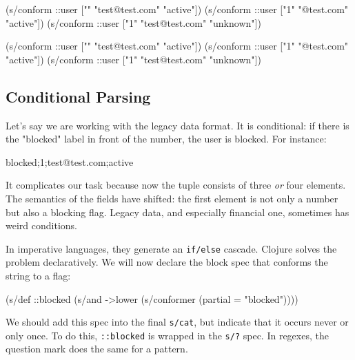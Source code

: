 \begin{english}
  \begin{clojure}
(s/conform ::user
  ["" "test@test.com" "active"])
(s/conform ::user
  ["1" "@test.com" "active"])
(s/conform ::user
  ["1" "test@test.com" "unknown"])
  \end{clojure}
\end{english}

\else

\begin{english}
 \begin{clojure}
(s/conform ::user ["" "test@test.com" "active"])
(s/conform ::user ["1" "@test.com" "active"])
(s/conform ::user ["1" "test@test.com" "unknown"])
  \end{clojure}
\end{english}

\fi

\subsection{Conditional Parsing}

Let's say we are working with the legacy data format. It is conditional: if there is the "blocked" label in front of the number, the user is blocked. For instance:

\begin{english}
  \begin{text}
blocked;1;test@test.com;active
  \end{text}
\end{english}

It complicates our task because now the tuple consists of three 
\emph{or} four elements. The semantics of the fields have shifted: the first element is not only a number but also a blocking flag. Legacy data, and especially financial one, sometimes has weird conditions.

In imperative languages, they generate an \verb|if/else| cascade. Clojure solves the problem declaratively. We will now declare the block spec that conforms the string to a flag:

\begin{english}
  \begin{clojure}
(s/def ::blocked
  (s/and
   ->lower
   (s/conformer (partial = "blocked"))))
  \end{clojure}
\end{english}


We should add this spec into the final \verb|s/cat|, but indicate that it occurs never or only once. To do this, \verb|::blocked| is wrapped in the \verb|s/?| spec. In regexes, the question mark does the same for a pattern.

